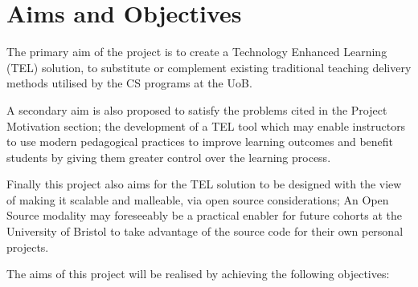 \section{Aims and Objectives}
\label{sec1:sec02}

The primary aim of the project is to create a Technology Enhanced Learning (TEL) solution, to substitute or complement existing traditional teaching delivery methods utilised by the CS programs at the UoB.

A secondary aim is also proposed to satisfy the problems cited in the Project Motivation section; the development of a TEL tool which may enable instructors to use modern pedagogical practices to improve learning outcomes and benefit students by giving them greater control over the learning process.

Finally this project also aims for the TEL solution to be designed with the view of making it scalable and malleable, via open source considerations; An Open Source modality  may foreseeably be a practical enabler for future cohorts at the University of Bristol to take advantage of the source code for their own personal projects. 

\newpage
The aims of this project will be realised by achieving the following objectives:


